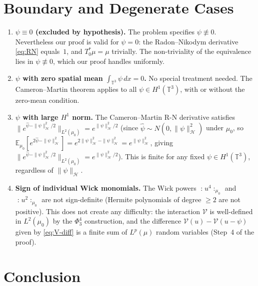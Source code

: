 \documentclass[11pt,a4paper]{article}
\theoremstyle{plain}
\theoremstyle{definition}
\newcommand{\T}{\mathbb{T}}
\newcommand{\cH}{\mathcal{H}}
\newcommand{\cV}{\mathcal{V}}
\newcommand{\E}{\mathbb{E}}
\newcommand{\norm}[1]{\|#1\|}
\newcommand{\wick}[1]{\mathopen{:}\!#1\!\mathclose{:}}
\begin{document}
\section{Boundary and Degenerate Cases}

\begin{enumerate}
\item \textbf{$\psi\equiv 0$ (excluded by hypothesis).}
  The problem specifies $\psi\not\equiv0$.  Nevertheless our proof is valid for $\psi=0$:
  the Radon--Nikodym derivative \eqref{eq:RN} equals~$1$, and $T_0^*\mu=\mu$ trivially.
  The non-triviality of the equivalence lies in $\psi\not\equiv0$, which our proof
  handles uniformly.

\item \textbf{$\psi$ with zero spatial mean $\int_{\T^3}\psi\,dx=0$.}
  No special treatment needed.  The Cameron--Martin theorem applies to all
  $\psi\in H^1(\T^3)$, with or without the zero-mean condition.

\item \textbf{$\psi$ with large $H^1$ norm.}
  The Cameron--Martin R-N derivative satisfies
  $\norm{e^{\hat\psi-\norm\psi_\cH^2/2}}_{L^2(\mu_0)} = e^{\norm\psi_\cH^2/2}$
  (since $\hat\psi\sim N(0,\norm\psi_\cH^2)$ under $\mu_0$,
  so $\E_{\mu_0}[e^{2\hat\psi-\norm\psi^2_\cH}]=e^{2\norm\psi^2_\cH - \norm\psi^2_\cH}=e^{\norm\psi^2_\cH}$,
  giving $\norm{e^{\hat\psi-\norm\psi^2_\cH/2}}_{L^2(\mu_0)}=e^{\norm\psi^2_\cH/2}$).
  This is finite for any fixed $\psi\in H^1(\T^3)$, regardless of $\norm\psi_\cH$.

\item \textbf{Sign of individual Wick monomials.}
  The Wick powers $\wick{u^4}_{\mu_0}$ and $\wick{u^2}_{\mu_0}$ are not sign-definite
  (Hermite polynomials of degree $\ge2$ are not positive).  This does not create any
  difficulty: the interaction $\cV$ is well-defined in $L^2(\mu_0)$ by the $\Phi^4_3$
  construction, and the difference $\cV(u)-\cV(u-\psi)$ given by \eqref{eq:V-diff}
  is a finite sum of $L^p(\mu)$ random variables (Step~4 of the proof).
\end{enumerate}

\section{Conclusion}
\end{document}
